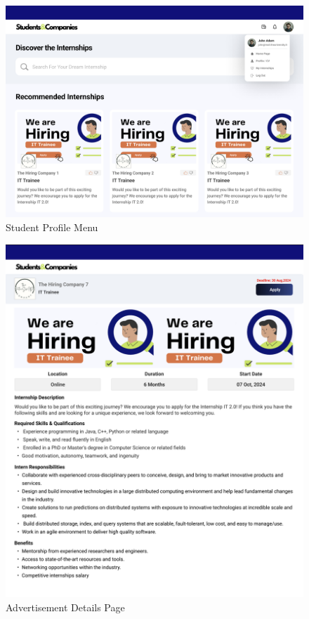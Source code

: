 \documentclass[a4paper,12pt]{article}
\begin{document}
\begin{figure}[H]
    \centering
    \includegraphics[scale = 0.40]{figures/UserInterfaces/Student/ProfileMenu.png}
    \caption{Student Profile Menu}
     \centering
\end{figure}

\begin{figure}[H]
    \centering
    \includegraphics[scale = 0.55]{figures/UserInterfaces/Student/AdvertisementPage.png}
    \caption{Advertisement Details Page}
     \centering
\end{figure}
\end{document}
